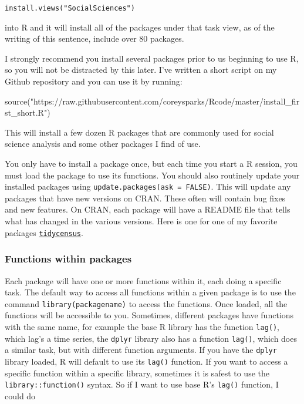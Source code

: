 \documentclass[
]{article}
\newenvironment{Shaded}{\begin{snugshade}}{\end{snugshade}}
\newcommand{\FunctionTok}[1]{\textcolor[rgb]{0.00,0.00,0.00}{#1}}
\newcommand{\NormalTok}[1]{#1}
\newcommand{\StringTok}[1]{\textcolor[rgb]{0.31,0.60,0.02}{#1}}
\begin{document}
\texttt{install.views("SocialSciences")}

into R and it will install all of the packages under that task view, as
of the writing of this sentence, include over 80 packages.

I strongly recommend you install several packages prior to us beginning
to use R, so you will not be distracted by this later. I've written a
short script on my Github repository and you can use it by running:

\begin{Shaded}
\begin{Highlighting}[]
\FunctionTok{source}\NormalTok{(}\StringTok{"https://raw.githubusercontent.com/coreysparks/Rcode/master/install\_first\_short.R"}\NormalTok{)}
\end{Highlighting}
\end{Shaded}

This will install a few dozen R packages that are commonly used for
social science analysis and some other packages I find of use.

You only have to install a package once, but each time you start a R
session, you must load the package to use its functions. You should also
routinely update your installed packages using
\texttt{update.packages(ask\ =\ FALSE)}. This will update any packages that have
new versions on CRAN. These often will contain bug fixes and new
features. On CRAN, each package will have a README file that tells what
has changed in the various versions. Here is one for one of my favorite
packages
\href{https://cran.r-project.org/web/packages/tidycensus/readme/README.html}{\texttt{tidycensus}}.

\hypertarget{functions-within-packages}{%
\subsubsection{Functions within packages}\label{functions-within-packages}}

Each package will have one or more functions within it, each doing a
specific task. The default way to access all functions within a given
package is to use the command \texttt{library(packagename)} to access the
functions. Once loaded, all the functions will be accessible to you.
Sometimes, different packages have functions with the same name, for
example the base R library has the function \texttt{lag()}, which lag's a time
series, the \texttt{dplyr} library also has a function \texttt{lag()}, which does a
similar task, but with different function arguments. If you have the
\texttt{dplyr} library loaded, R will default to use its \texttt{lag()} function. If
you want to access a specific function within a specific library,
sometimes it is safest to use the \texttt{library::function()} syntax. So if I
want to use base R's \texttt{lag()} function, I could do
\end{document}
